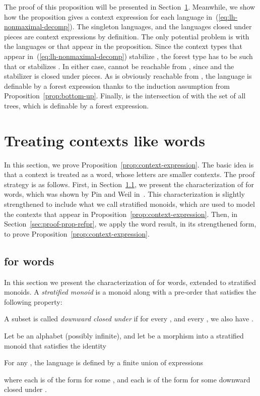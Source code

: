 \documentclass{LMCS}
\begin{document}
The proof of this proposition will be presented in
Section~\ref{sec:treat-cont-like-words}. Meanwhile, we show how the
proposition gives a  context expression for each language 
in~(\ref{eq:lh-nonmaximal-decomp}). The singleton languages, and the
languages closed under pieces are  context expressions by
definition.  The only potential problem is with the languages  or  that appear in the proposition.  Since the
context types  that appear in~(\ref{eq:lh-nonmaximal-decomp})
stabilize , the forest type  has to be such that  or
 stabilizes . In either case,  cannot be reachable
from , since  and the stabilizer is closed under
pieces. As  is obviously reachable from , the language  is
definable by a  forest expression thanks to the induction
assumption from Proposition~\ref{prop:bottom-up}. Finally,  is
the intersection of  with the set of all trees, which is
definable by a  forest expression.


\section{Treating contexts like words}
\label{sec:treat-cont-like-words}
In this section, we prove Proposition~\ref{prop:context-expression}.
The basic idea is that a context is treated as a word, whose letters are smaller contexts.
The proof strategy is as follows. First, in Section~\ref{sec:inter-words}, we
present the characterization of \Dtwo for words, which was shown by Pin and
Weil in~\cite{weilpinpoly}. This characterization is slightly strengthened to
include what we call stratified monoids, which are used to model the contexts
that appear in Proposition~\ref{prop:context-expression}.  Then, in
Section~\ref{sec:proof-prop-refpr}, we apply the word result, in its
strengthened form, to prove Proposition~\ref{prop:context-expression}.

\subsection{\texorpdfstring{\Dtwo}{Dtwol} for words}
\label{sec:inter-words}
In this section we present the characterization of \Dtwo for words,
extended to stratified monoids.  A \emph{stratified monoid} is a
monoid  along with a pre-order  that satisfies the following
property:

A subset  is called \emph{downward closed under } if for every , and every , we also have .
 
\begin{prop}\label{prop:word-da}
  Let  be an alphabet (possibly infinite), and let  be a morphism into a stratified monoid  that satisfies
  the identity
  
  For any , the language  is defined by a
  finite union of expressions
  
  where each  is of the form  for some , and each  is of the form  for
  some  downward closed under .
\end{prop}
\end{document}
